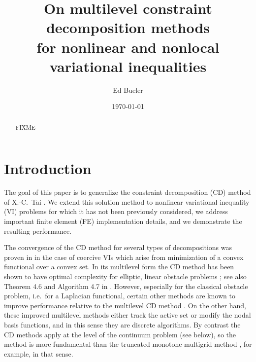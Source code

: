 \documentclass[letterpaper,final,12pt,reqno]{amsart}
\theoremstyle{cstyle}
\theoremstyle{dstyle}
\numberwithin{equation}{section}
\numberwithin{figure}{section}
\numberwithin{table}{section}
\numberwithin{theorem}{section}
\begin{document}
\title[On MCD methods for nonlinear and nonlocal VIs]{On multilevel constraint decomposition methods \\ for nonlinear and nonlocal variational inequalities}

\author{Ed Bueler}

\date{\today}

\begin{abstract} FIXME
\end{abstract}

\maketitle


\thispagestyle{empty}

\section{Introduction} \label{sec:intro}

The goal of this paper is to generalize the constraint decomposition (CD) method of X.-C.~Tai \cite{Tai2003}.  We extend this solution method to nonlinear variational inequality (VI) problems for which it has not been previously considered, we address important finite element (FE) implementation details, and we demonstrate the resulting performance.

The convergence of the CD method for several types of decompositions was proven in \cite{Tai2003} in the case of coercive VIs which arise from minimization of a convex functional over a convex set.  In its multilevel form the CD method has been shown to have optimal complexity for elliptic, linear obstacle problems \cite[subsection 5.4]{Tai2003}; see also Theorem 4.6 and Algorithm 4.7 in \cite{GraeserKornhuber2009}.  However, especially for the classical obstacle problem, i.e.~for a Laplacian functional, certain other methods are known to improve performance relative to the multilevel CD method \cite{GraeserKornhuber2009}.  On the other hand, these improved multilevel methods either track the active set or modify the nodal basis functions, and in this sense they are discrete algorithms.  By contrast the CD methods apply at the level of the continuum problem (see below), so the method is more fundamental than the truncated monotone multigrid method \cite{GraeserKornhuber2009,Kornhuber1994}, for example, in that sense.
\end{document}
